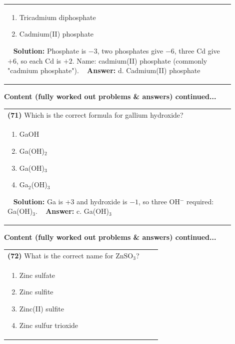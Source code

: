 \documentclass{article}
\begin{document}
{\begin{tabular}{|p{0.9\linewidth}|}
\begin{minipage}[t]{0.85\linewidth}
\begin{enumerate}[label=\alph*.]
\item Tricadmium diphosphate \
\item Cadmium(II) phosphate
\end{enumerate}
\end{minipage}\
\hline
\vspace{0.2cm}
\textbf{Solution:} Phosphate is $-3$, two phosphates give $-6$, three Cd give $+6$, so each Cd is $+2$. Name: cadmium(II) phosphate (commonly "cadmium phosphate"). \
\hline
\vspace{0.2cm}
\textbf{Answer:} d. Cadmium(II) phosphate \
\hline
\end{tabular}
\newpage
\noindent
{\large\textbf{Content (fully worked out problems & answers) continued...}}\\[0.2em]
\begin{tabular}{|p{0.9\linewidth}|}
\hline
\vspace{0.2cm}
\textbf{(71)} Which is the correct formula for gallium hydroxide? \\
\begin{minipage}[t]{0.85\linewidth}
\begin{enumerate}[label=\alph*.]
\item GaOH \
\item Ga(OH)$_2$ \
\item Ga(OH)$_3$ \
\item Ga$_2$(OH)$_3$
\end{enumerate}
\end{minipage}\
\hline
\vspace{0.2cm}
\textbf{Solution:} Ga is +3 and hydroxide is $-1$, so three OH$^-$ required: Ga(OH)$_3$. \
\hline
\vspace{0.2cm}
\textbf{Answer:} c. Ga(OH)$_3$ \
\hline
\end{tabular}
\newpage
\noindent
{\large\textbf{Content (fully worked out problems & answers) continued...}}\\[0.2em]
\begin{tabular}{|p{0.9\linewidth}|}
\hline
\vspace{0.2cm}
\textbf{(72)} What is the correct name for $\text{ZnSO}_3$? \\
\begin{minipage}[t]{0.85\linewidth}
\begin{enumerate}[label=\alph*.]
\item Zinc sulfate \
\item Zinc sulfite \
\item Zinc(II) sulfite \
\item Zinc sulfur trioxide

\end{enumerate}
\end{minipage}
\end{tabular}}
\end{document}
